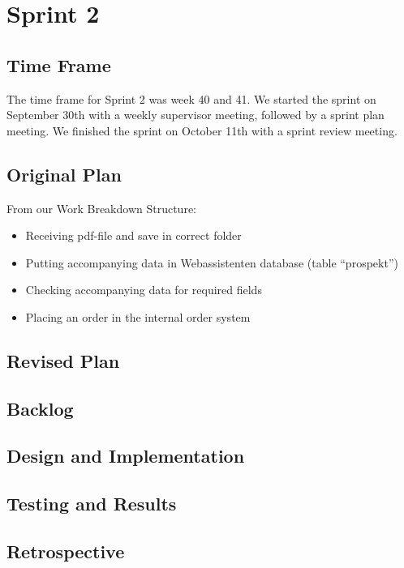 \section{Sprint 2}
\subsection{Time Frame}
The time frame for Sprint 2 was week 40 and 41. We started the sprint on September 30th with a weekly supervisor meeting, followed by a sprint plan meeting. We finished the sprint on October 11th with a sprint review meeting.
\subsection{Original Plan}
From our Work Breakdown Structure:
\begin{itemize}
	\item Receiving pdf-file and save in correct folder
	\item Putting accompanying data in Webassistenten database (table “prospekt”)
	\item Checking accompanying data for required fields
	\item Placing an order in the internal order system
\end{itemize}
\subsection{Revised Plan}
\subsection{Backlog}
\subsection{Design and Implementation}
\subsection{Testing and Results}
\subsection{Retrospective}

